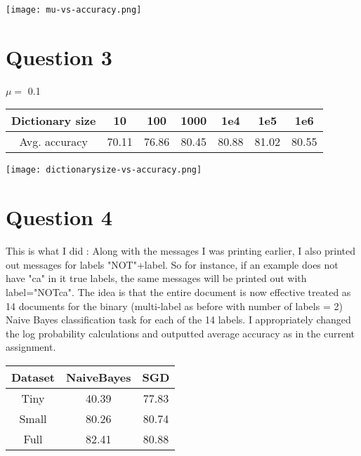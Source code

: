 \documentclass[paper=a4, fontsize=11pt]{scrartcl} %
\numberwithin{equation}{section} %
\numberwithin{figure}{section} %
\numberwithin{table}{section} %
\begin{document}
\begin{center}
\texttt{[image: mu-vs-accuracy.png]}
\end{center}

\section*{\textbf{Question 3}}
$\mu=$ 0.1 \\
\begin{tabular}{ | c | c | c | c | c | c | c |}
\hline
Dictionary size & 10 & 100 & 1000 & 1e4 & 1e5 & 1e6 \\
\hline
Avg. accuracy & 70.11 & 76.86 &	80.45 & 80.88 & 81.02 & 80.55 \\
\hline
\end{tabular}

\begin{center}
\texttt{[image: dictionarysize-vs-accuracy.png]}
\end{center}

\section*{\textbf{Question 4}}
This is what I did : Along with the messages I was printing earlier, I also printed out messages for labels "NOT"+label. So for instance, if an example does not have "ca" in it true labels, the same messages will be printed out with label="NOTca". The idea is that the entire document is now effective treated as 14 documents for the binary (multi-label as before with number of labels = 2) Naive Bayes classification task for each of the 14 labels. I appropriately changed the log probability calculations and outputted average accuracy as in the current assignment.  \\

\begin{tabular}{| c | c | c |}
\hline
\textbf{Dataset} & \textbf{NaiveBayes} & \textbf{SGD} \\
\hline
Tiny & 40.39	 & 77.83 \\
\hline
Small &	80.26 & 80.74 \\
\hline
Full	 & 82.41 & 80.88 \\
\hline
\end{tabular}

\pagebreak
\end{document}
